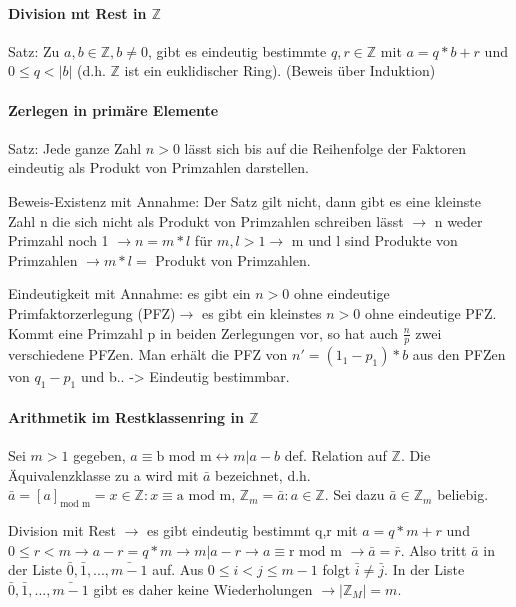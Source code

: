 \documentclass[10pt,landscape]{article}
\begin{document}
\begin{multicols}{3}
\paragraph{Division mt Rest in $\mathbb{Z}$}
Satz: Zu $a,b\in\mathbb{Z}, b \not= 0$, gibt es eindeutig bestimmte $q,r\in \mathbb{Z}$ mit $a=q*b+r$ und $0\leq q <|b|$ (d.h. $\mathbb{Z}$ ist ein euklidischer Ring). (Beweis über Induktion)

\paragraph{Zerlegen in primäre Elemente}
Satz: Jede ganze Zahl $n>0$ lässt sich bis auf die Reihenfolge der Faktoren eindeutig als Produkt von Primzahlen darstellen.

Beweis-Existenz mit Annahme: Der Satz gilt nicht, dann gibt es eine kleinste Zahl n die sich nicht als Produkt von Primzahlen schreiben lässt $\rightarrow$ n weder Primzahl noch 1 $\rightarrow n=m*l$ für $m,l>1 \rightarrow$ m und l sind Produkte von Primzahlen $\rightarrow m*l=$ Produkt von Primzahlen.

Eindeutigkeit mit Annahme: es gibt ein $n>0$ ohne eindeutige Primfaktorzerlegung (PFZ)$\rightarrow$ es gibt ein kleinstes $n>0$ ohne eindeutige PFZ. Kommt eine Primzahl p in beiden Zerlegungen vor, so hat auch $\frac{n}{p}$ zwei verschiedene PFZen. Man erhält die PFZ von $n'=(1_1-p_1)*b$ aus den PFZen von $q_1-p_1$ und b.. -> Eindeutig bestimmbar.

\paragraph{Arithmetik im Restklassenring in $\mathbb{Z}$}
Sei $m > 1$ gegeben, $a\equiv \text{b mod m} \leftrightarrow m|a-b$ def. Relation auf $\mathbb{Z}$. Die Äquivalenzklasse zu a wird mit $\bar{a}$ bezeichnet, d.h. $\bar{a}=[a]_{\text{mod m}}={x\in \mathbb{Z}: x\equiv \text{a mod m}}$, $\mathbb{Z}_m={\bar{a}:a\in \mathbb{Z}}$. Sei dazu $\bar{a}\in \mathbb{Z}_m$ beliebig.

Division mit Rest $\rightarrow$ es gibt eindeutig bestimmt q,r mit $a=q*m+r$ und $0\leq r < m \rightarrow a-r=q*m \rightarrow m| a-r \rightarrow a\equiv \text{r mod m } \rightarrow \bar{a}=\bar{r}$. Also tritt $\bar{a}$ in der Liste $\bar{0},\bar{1},...,\bar{m-1}$ auf. Aus $0\leq i < j \leq m-1$ folgt $\bar{i}\not=\bar{j}$. In der Liste $\bar{0},\bar{1},...,\bar{m-1}$ gibt es daher keine Wiederholungen $\rightarrow |\mathbb{Z}_M|=m$.


\end{multicols}
\end{document}
